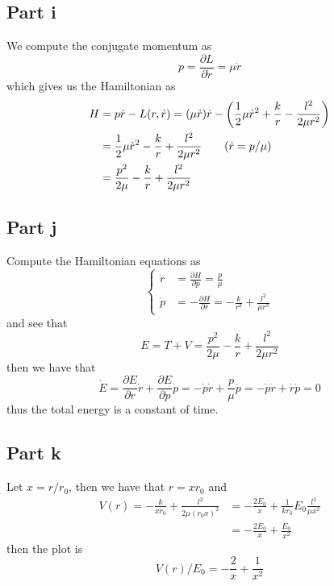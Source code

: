 \documentclass[12pt]{report}
\begin{document}
\subsection*{Part i}
We compute the conjugate momentum as
\begin{equation*}
    p =\frac{\partial L}{\partial \dot{r}} = \mu \dot{r}
\end{equation*}
which gives us the Hamiltonian as
\begin{align*}
    H &= p\dot{r} - L(r,\dot{r}) = (\mu \dot{r})\dot{r} - \left(\frac{1}{2}\mu \dot{r}^2 + \frac{k}{r} - \frac{l^2}{2\mu r^2}\right) \\
    &= \frac{1}{2}\mu \dot{r}^2 - \frac{k}{r} + \frac{l^2}{2\mu r^2} \tag{$\dot{r} = p/\mu$}\\
    &= \frac{p^2}{2\mu} - \frac{k}{r} + \frac{l^2}{2\mu r^2}
\end{align*}
\subsection*{Part j}
Compute the Hamiltonian equations as
\begin{equation*}
\begin{cases}
\dot{r} &= \frac{\partial H}{\partial p} = \frac{p}{\mu} \\
\dot{p} &=-\frac{\partial H}{\partial r} = -\frac{k}{r^2} + \frac{l^2}{\mu r^3}
\end{cases}    
\end{equation*}
and see that
\begin{equation*}
    E = T + V = \frac{p^2}{2\mu} - \frac{k}{r} + \frac{l^2}{2\mu r^2}
\end{equation*}
then we have that
\begin{equation*}
    \dot{E} = \frac{\partial E}{\partial r}\dot{r} + \frac{\partial E}{\partial p} \dot{p} = -\dot{p}\dot{r} + \frac{p}{\mu} \dot{p} = -\dot{p}\dot{r} + \dot{r}\dot{p} = 0
\end{equation*}
thus the total energy is a constant of time.

\subsection*{Part k}
Let $x = r/r_0$, then we have that $r = xr_0$ and 
\begin{align*}
    V(r) = -\frac{k}{xr_0} + \frac{l^2}{2\mu (r_0x)^2} &= -\frac{2E_0}{x} + \frac{1}{kr_0}E_0 \frac{l^2}{\mu x^2} \\
    &= -\frac{2E_0}{x} + \frac{E_0}{x^2}
\end{align*}
then the plot is
\begin{equation*}
    V(r)/E_0 = -\frac{2}{x} + \frac{1}{x^2}
\end{equation*}
\end{document}
